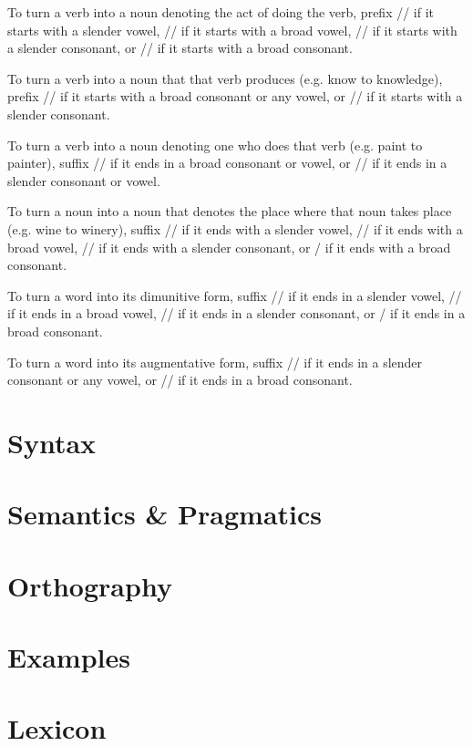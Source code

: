 \documentclass{article}
\begin{document}
To turn a verb into a noun denoting the act of doing the verb, prefix // if it starts with a slender vowel, // if it starts with a broad vowel, // if it starts with a slender consonant, or // if it starts with a broad consonant.

To turn a verb into a noun that that verb produces (e.g. know to knowledge), prefix // if it starts with a broad consonant or any vowel, or // if it starts with a slender consonant.

To turn a verb into a noun denoting one who does that verb (e.g. paint to painter), suffix // if it ends in a broad consonant or vowel, or // if it ends in a slender consonant or vowel.

To turn a noun into a noun that denotes the place where that noun takes place (e.g. wine to winery), suffix // if it ends with a slender vowel, // if it ends with a broad vowel, // if it ends with a slender consonant, or / if it ends with a broad consonant.

To turn a word into its dimunitive form, suffix // if it ends in a slender vowel, // if it ends in a broad vowel, // if it ends in a slender consonant, or / if it ends in a broad consonant.

To turn a word into its augmentative form, suffix // if it ends in a slender consonant or any vowel, or // if it ends in a broad consonant.
\newpage
\part{Syntax}
\newpage
\part{Semantics \& Pragmatics}
\newpage
\part{Orthography}
\newpage
\part{Examples}
\newpage
\part{Lexicon}
\end{document}
